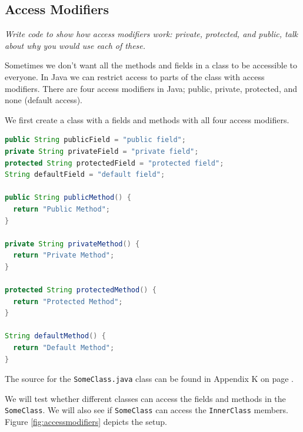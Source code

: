 \subsection{Access Modifiers}
\textit{Write code to show how access modifiers work: private, protected, and public, talk about why you would use each of these.}

Sometimes we don't want all the methods and fields in a class to be accessible to everyone. In Java we can restrict access to parts of the class with access modifiers. There are four access modifiers in Java; public, private, protected, and none (default access).

We first create a class with a fields and methods with all four access modifiers.
\begin{lstlisting}[language=Java]
public String publicField = "public field";
private String privateField = "private field";
protected String protectedField = "protected field";
String defaultField = "default field";

public String publicMethod() {
  return "Public Method";
}

private String privateMethod() {
  return "Private Method";
}

protected String protectedMethod() {
  return "Protected Method";
}

String defaultMethod() {
  return "Default Method";
}
\end{lstlisting}

The source for the \texttt{SomeClass.java} class can be found in Appendix K on page \pageref{App:AppendixK}.

We will test whether different classes can access the fields and methods in the \texttt{SomeClass}. We will also see if \texttt{SomeClass} can access the \texttt{InnerClass} members. Figure \ref{fig:accessmodifiers} depicts the setup.

